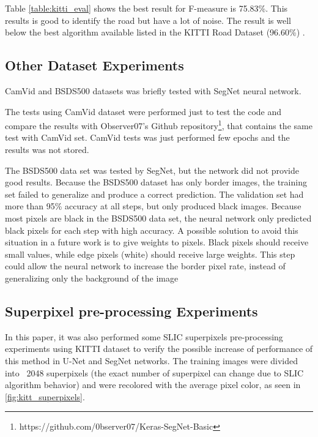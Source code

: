 \documentclass[10pt,twocolumn,letterpaper]{article}
\begin{document}
Table \ref{table:kitti_eval} shows the best result for F-measure is 75.83\%. This results is good to identify the road but have a lot of noise. The result is well below the best algorithm available listed in the KITTI Road Dataset (96.60\%) \cite{KITTI_WEBSITE}.

\subsection{Other Dataset Experiments} \label{ssec:other_experiments}

CamVid and BSDS500 datasets was briefly tested with SegNet neural network. 

The tests using CamVid dataset were performed just to test the code and compare the results with Observer07's Github repository\footnote{https://github.com/0bserver07/Keras-SegNet-Basic}, that contains the same test with CamVid set. CamVid tests was just performed few epochs and the results was not stored.

The BSDS500 data set was tested by SegNet, but the network did not provide good results. Because the BSDS500 dataset has only border images, the training set failed to generalize and produce a correct prediction. The validation set had more than 95\% accuracy at all steps, but only produced black images. Because most pixels are black in the BSDS500 data set, the neural network only predicted black pixels for each step with high accuracy. A possible solution to avoid this situation in a future work is to give weights to pixels. Black pixels should receive small values, while edge pixels (white) should receive large weights. This step could allow the neural network to increase the border pixel rate, instead of generalizing only the background of the image

\subsection{Superpixel pre-processing Experiments} \label{ssec:superpixel_experiments}

In this paper, it was also performed some SLIC superpixels pre-processing experiments using KITTI dataset to verify the possible increase of performance of this method in U-Net and SegNet networks. The training images were divided into ~2048 superpixels (the exact number of superpixel can change due to SLIC algorithm behavior) and were recolored with the average pixel color, as seen in \ref{fig:kitt_superpixels}. 
\end{document}
